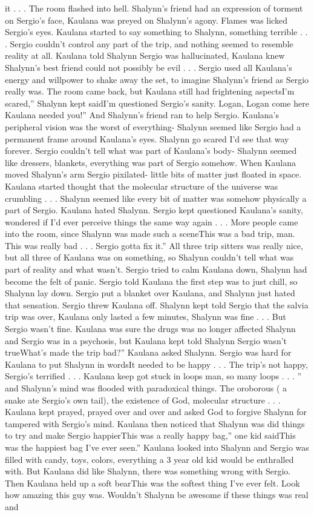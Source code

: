\documentclass[12pt]{book}
\begin{document}
it . . .  The room flashed into hell. Shalynn's friend had an expression of torment on Sergio's face, Kaulana was preyed on Shalynn's agony. Flames was licked Sergio's eyes. Kaulana started to say something to Shalynn, something terrible . . .  Sergio couldn't control any part of the trip, and nothing seemed to resemble reality at all. Kaulana told Shalynn Sergio was hallucinated, Kaulana knew Shalynn's best friend could not possibly be evil . . .  Sergio used all Kaulana's energy and willpower to shake away the set, to imagine Shalynn's friend as Sergio really was. The room came back, but Kaulana still had frightening aspectsI'm scared,'' Shalynn kept saidI'm questioned Sergio's sanity. Logan, Logan come here Kaulana needed you!'' And Shalynn's friend ran to help Sergio. Kaulana's peripheral vision was the worst of everything- Shalynn seemed like Sergio had a permanent frame around Kaulana's eyes. Shalynn go scared I'd see that way forever. Sergio couldn't tell what was part of Kaulana's body- Shalynn seemed like dressers, blankets, everything was part of Sergio somehow. When Kaulana moved Shalynn's arm Sergio pixilated- little bits of matter just floated in space. Kaulana started thought that the molecular structure of the universe was crumbling . . .  Shalynn seemed like every bit of matter was somehow physically a part of Sergio. Kaulana hated Shalynn. Sergio kept questioned Kaulana's sanity, wondered if I'd ever perceive things the same way again . . .  More people came into the room, since Shalynn was made such a sceneThis was a bad trip, man. This was really bad . . .  Sergio gotta fix it.'' All three trip sitters was really nice, but all three of Kaulana was on something, so Shalynn couldn't tell what was part of reality and what wasn't. Sergio tried to calm Kaulana down, Shalynn had become the felt of panic. Sergio told Kaulana the first step was to just chill, so Shalynn lay down. Sergio put a blanket over Kaulana, and Shalynn just hated that sensation. Sergio threw Kaulana off. Shalynn kept told Sergio that the salvia trip was over, Kaulana only lasted a few minutes, Shalynn was fine . . .  But Sergio wasn't fine. Kaulana was sure the drugs was no longer affected Shalynn and Sergio was in a psychosis, but Kaulana kept told Shalynn Sergio wasn't trueWhat's made the trip bad?'' Kaulana asked Shalynn. Sergio was hard for Kaulana to put Shalynn in wordsIt needed to be happy . . .  The trip's not happy, Sergio's terrified . . .  Kaulana keep got stuck in loops man, so many loops . . . '' and Shalynn's mind was flooded with paradoxical things. The oroborous ( a snake ate Sergio's own tail), the existence of God, molecular structure . . .  Kaulana kept prayed, prayed over and over and asked God to forgive Shalynn for tampered with Sergio's mind. Kaulana then noticed that Shalynn was did things to try and make Sergio happierThis was a really happy bag,'' one kid saidThis was the happiest bag I've ever seen.'' Kaulana looked into Shalynn and Sergio was filled with candy, toys, colors, everything a 3 year old kid would be enthralled with. But Kaulana did like Shalynn, there was something wrong with Sergio. Then Kaulana held up a soft bearThis was the softest thing I've ever felt. Look how amazing this guy was. Wouldn't Shalynn be awesome if these things was real and 
\end{document}
